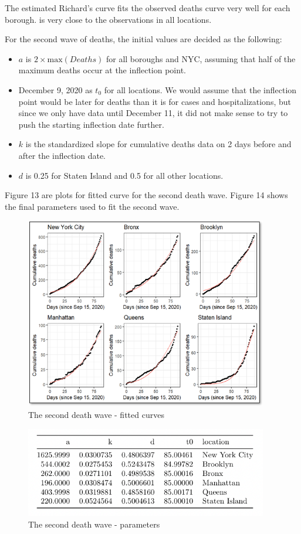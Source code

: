 \documentclass[
]{article}
\providecommand{\tightlist}{%
  \setlength{\itemsep}{0pt}\setlength{\parskip}{0pt}}
\begin{document}
The estimated Richard's curve fits the observed deaths curve very well
for each borough. is very close to the observations in all locations.

For the second wave of deaths, the initial values are decided as the
following:

\begin{itemize}
\tightlist
\item
  \(a\) is \(2 \times \mbox{max}(Deaths)\) for all boroughs and NYC,
  assuming that half of the maximum deaths occur at the inflection
  point.
\item
  December 9, 2020 as \(t_0\) for all locations. We would assume that
  the inflection point would be later for deaths than it is for cases
  and hospitalizations, but since we only have data until December 11,
  it did not make sense to try to push the starting inflection date
  further.
\item
  \(k\) is the standardized slope for cumulative deaths data on 2 days
  before and after the inflection date.
\item
  \(d\) is 0.25 for Staten Island and 0.5 for all other locations.
\end{itemize}

Figure 13 are plots for fitted curve for the second death wave. Figure
14 shows the final parameters used to fit the second wave.

\begin{figure}
\centering
\includegraphics[width=4.16667in,height=\textheight]{plots/death_plots/wave2_plots.png}
\caption{The second death wave - fitted curves}
\end{figure}

\begin{figure}
\centering
\includegraphics[width=4.16667in,height=\textheight]{plots/death_plots/deaths_final_prarameters.png}
\caption{The second death wave - parameters}
\end{figure}
\end{document}
